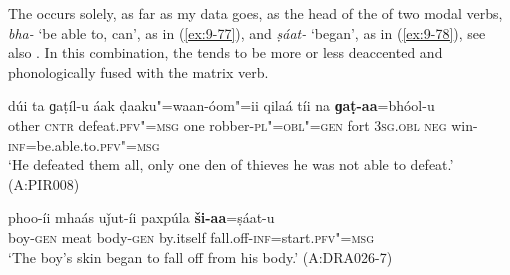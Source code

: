 The  occurs solely, as far as my data goes, as the head of the  of two modal
verbs, \textit{bha-} `be able to, can', as in (\ref{ex:9-77}), and \textit{ṣáat-} `began', as in (\ref{ex:9-78}), see also
. In this combination, the  tends to be more or less deaccented and phonologically fused with the matrix   verb.

\begin{exe}
\ex
\label{ex:9-77}
\gll dúi ta ɡaṭíl-u áak ḍaaku"=waan-óom"=ii qilaá tíi na \textbf{ɡaṭ-aa}=bhóol-u  \\
other \textsc{cntr} defeat.\textsc{pfv"=msg} one robber-\textsc{pl"=obl"=gen}  fort \textsc{3sg.obl} \textsc{neg} win-\textsc{inf}=be.able.to.\textsc{pfv"=msg} \\
\glt `He defeated them all, only one den of thieves he was not able to defeat.' (A:PIR008)

\ex
\label{ex:9-78}
\gll phoo-íi mhaás uǰut-íi paxpúla \textbf{ši-aa}=ṣáat-u \\
boy-\textsc{gen} meat body-\textsc{gen} by.itself fall.off-\textsc{inf}=start.\textsc{pfv"=msg} \\
\glt `The boy's skin began to fall off from his body.' (A:DRA026-7) 
\end{exe}